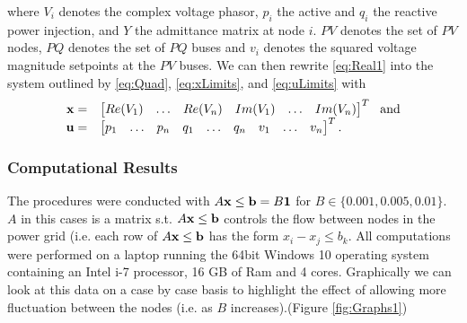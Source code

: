where $V_i$ denotes the complex voltage phasor, $p_i$ the active and $q_i$ the reactive power injection, and $Y$ the admittance matrix at node $i$. $PV$ denotes the set of $PV$ nodes, $PQ$ denotes the set of $PQ$ buses and $v_i$ denotes the squared voltage magnitude setpoints at the $PV$ buses. We can then rewrite \cref{eq:Real1} into the system outlined by \cref{eq:Quad}, \cref{eq:xLimits}, and \cref{eq:uLimits} with 
\[
\begin{array}{rl}
\mathbf{x}= & \begin{bmatrix} Re(V_1) & \dots & Re(V_n) & Im(V_1) & \dots  &  Im(V_n) \end{bmatrix}^T ~~\mbox{and} \\
\mathbf{u}=& \begin{bmatrix} p_1 &  \dots &  p_n &  q_1 &  \dots &  q_n &  v_1 &  \dots &  v_n \end{bmatrix}^T.
\end{array}
\]



\subsubsection{Computational Results}


The procedures were conducted with $A\mathbf{x} \leq \mathbf{b} = B \mathbf{1}$ for $B\in\{0.001, 0.005,0.01\}$.
$A$ in this cases is a matrix s.t. $A\mathbf{x} \leq \mathbf{b}$ controls the flow between nodes in the power grid (i.e. each row of $A\mathbf{x} \leq \mathbf{b}$ has the form $x_i-x_j\leq b_k$. 
All computations were performed on a laptop running the 64bit Windows 10 operating system containing an Intel i-7 processor, 16 GB of Ram and 4 cores. 
Graphically we can look at this data on a case by case basis to highlight the effect of allowing more fluctuation between the nodes (i.e. as $B$ increases).(Figure \ref{fig:Graphs1}) 

